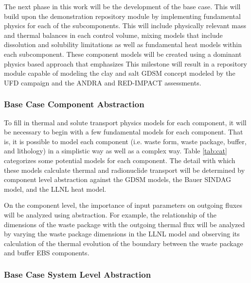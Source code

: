 
The next phase in this work will be the development of the base case. This will 
build upon the demonstration repository module by implementing fundamental 
physics for each of the subcomponents. This will include physically relevant 
mass and thermal balances in each control volume, mixing models that include 
dissolution and solubility limitations as well as fundamental heat  models within 
each subcomponent. These component models will be created using a dominant 
physics based approach that emphasizes  This milestone will result in a repository 
module capable of modeling the clay and salt \gls{GDSM} concept modeled by the 
\gls{UFD} campaign and the \gls{ANDRA} and RED-IMPACT  assessments.

\subsubsection{Base Case Component Abstraction}


To fill in thermal and solute transport physics models for each component, it 
will be necessary to begin with a few fundamental models for each component. 
That is, it is possible to model each component (i.e. waste form, waste package, 
buffer, and lithology) in a simplistic way as well as a complex way. Table 
\ref{tab:cat} categorizes some potential models for each component. The detail 
with which these models calculate thermal and radionuclide transport will be 
determined by component level abstraction against the \gls{GDSM} models, the 
Bauer \gls{SINDAG} model, and the \gls{LLNL} heat model.


  


On the component level, the importance of input parameters on outgoing fluxes 
will be analyzed using abstraction. For example, the relationship of the 
dimensions  of the waste package with the outgoing thermal flux 
will be analyzed by varying the waste package dimensions in the \gls{LLNL} 
model and observing its calculation of the thermal evolution of the boundary 
between the waste package and buffer \gls{EBS} components.

\subsubsection{Base Case System Level Abstraction}

